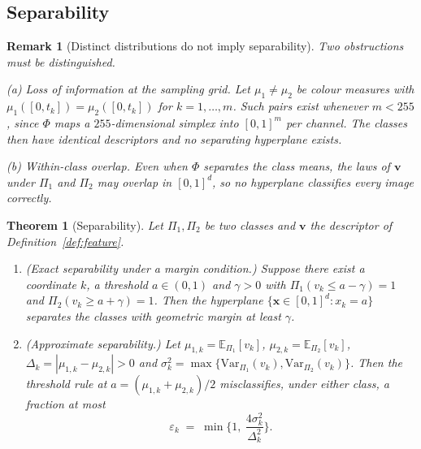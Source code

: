 \documentclass[pdflatex,sn-basic]{sn-jnl}
\theoremstyle{thmstyleone}%
\newtheorem{theorem}{Theorem}%
\theoremstyle{thmstyletwo}%
\newtheorem{remark}{Remark}%
\theoremstyle{thmstylethree}%
\begin{document}
\subsection{Separability}\label{sec:separability}

\begin{remark}[Distinct distributions do not imply
separability]\label{rem:counterexample}
Two obstructions must be distinguished.

\emph{(a) Loss of information at the sampling grid.} Let $\mu_1\neq\mu_2$ be
colour measures with $\mu_1([0,t_k])=\mu_2([0,t_k])$ for $k=1,\dots,m$. Such
pairs exist whenever $m<255$, since $\Phi$ maps a $255$-dimensional simplex
into $[0,1]^{m}$ per channel. The classes then have identical descriptors and
no separating hyperplane exists.

\emph{(b) Within-class overlap.} Even when $\Phi$ separates the class means,
the laws of $\mathbf{v}$ under $\Pi_1$ and $\Pi_2$ may overlap in $[0,1]^{d}$,
so no hyperplane classifies every image correctly.
\end{remark}

\begin{theorem}[Separability]\label{thm:separability}
Let $\Pi_1,\Pi_2$ be two classes and $\mathbf{v}$ the descriptor of
Definition~\ref{def:feature}.
\begin{enumerate}
\item[(i)] \emph{(Exact separability under a margin condition.)} Suppose there
exist a coordinate $k$, a threshold $a\in(0,1)$ and $\gamma>0$ with
$\Pi_1(v_{k}\le a-\gamma)=1$ and $\Pi_2(v_{k}\ge a+\gamma)=1$. Then the
hyperplane $\{\mathbf{x}\in[0,1]^{d}:x_{k}=a\}$ separates the classes with
geometric margin at least $\gamma$.

\item[(ii)] \emph{(Approximate separability.)} Let
$\mu_{1,k}=\mathbb{E}_{\Pi_1}[v_k]$, $\mu_{2,k}=\mathbb{E}_{\Pi_2}[v_k]$,
$\Delta_k=|\mu_{1,k}-\mu_{2,k}|>0$ and
$\sigma_k^2=\max\{\mathrm{Var}_{\Pi_1}(v_k),\mathrm{Var}_{\Pi_2}(v_k)\}$. Then
the threshold rule at $a=(\mu_{1,k}+\mu_{2,k})/2$ misclassifies, under either
class, a fraction at most
\begin{equation}\label{eq:cheb}
\varepsilon_k \;=\; \min\Big\{1,\ \frac{4\sigma_k^{2}}{\Delta_k^{2}}\Big\}.
\end{equation}
\end{enumerate}
\end{theorem}
\end{document}
